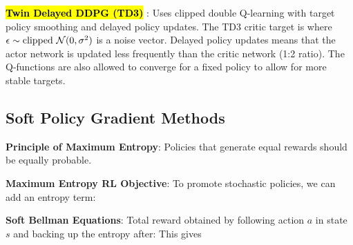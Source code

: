 \documentclass{article}
\begin{document}
  \hl{\textbf{Twin Delayed DDPG (TD3)}} \cite{fujimoto2018addressing}: Uses clipped double Q-learning with target policy smoothing and delayed policy updates. The TD3 critic target is
  where $\epsilon\sim\text{clipped }\mathcal{N}(0,\sigma^2)$ is a noise vector. Delayed policy updates means that the actor network is updated less frequently than the critic network (1:2 ratio). The Q-functions are also allowed to converge for a fixed policy to allow for more stable targets.

\subsection{Soft Policy Gradient Methods}

  \textbf{Principle of Maximum Entropy}: Policies that generate equal rewards should be equally probable. 

  \textbf{Maximum Entropy RL Objective}: To promote stochastic policies, we can add an entropy term:

  \textbf{Soft Bellman Equations}: Total reward obtained by following action $a$ in state $s$ and backing up the entropy after:
  This gives
\end{document}
